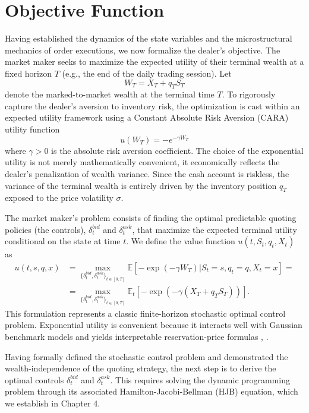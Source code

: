 \documentclass[a4paper,10pt,titlepage,oneside,openany]{book}
\theoremstyle{plain}\newtheorem{theorem}{Theorem}[chapter]
\theoremstyle{definition}\newtheorem{definition}{Definition}[chapter]
\theoremstyle{remark}\newtheorem{remark}{Remark}[chapter]
\begin{document}
\section{Objective Function}
Having established the dynamics of the state variables and the microstructural mechanics of order executions, we now formalize the dealer's objective. The market maker seeks to maximize the expected utility of their terminal wealth at a fixed horizon $T$ (e.g., the end of the daily trading session). Let 
\[
W_T = X_T + q_TS_T
\]
denote the marked-to-market wealth at the terminal time $T$. To rigorously capture the dealer's aversion to inventory risk, the optimization is cast within an expected utility framework using a Constant Absolute Risk Aversion (CARA) utility function
\[
u(W_T) = -e^{-\gamma W_T} 
\]
where $\gamma>0$ is the absolute risk aversion coefficient. The choice of the exponential utility is not merely mathematically convenient, it economically reflects the dealer's penalization of wealth variance. Since the cash account is riskless, the variance of the terminal wealth is entirely driven by the inventory position $q_T$ exposed to the price volatility $\sigma$.

The market maker's problem consists of finding the optimal predictable quoting policies (the controls), $\delta_t^{bid}$ and $\delta_t^{ask}$, that maximize the expected terminal utility conditional on the state at time $t$. We define the value function $u(t,S_t ,q_t, X_t)$ as
\begin{align*}
    u(t,s,q,x)&=\max_{\{\delta_t^{bid},\delta_t^{ask}\}_{t\in[0,T]}} \mathbb{E}\left[-\exp\!\left(-\gamma W_T\right)|S_t=s,q_t=q,X_t=x\right]=\\
    &=\max_{\{\delta_t^{bid},\delta_t^{ask}\}_{t\in[0,T]}} \mathbb{E}_t\left[-\exp\!\left(-\gamma (X_T+q_TS_T)\right)\right].
\end{align*}
This formulation represents a classic finite-horizon stochastic optimal control problem. Exponential utility is convenient because it interacts well with Gaussian benchmark models and yields interpretable reservation-price formulas \cite{AvellanedaStoikov2008}, \cite{GueantLehalleFernandezTapia2013}.

Having formally defined the stochastic control problem and demonstrated the wealth-independence of the quoting strategy, the next step is to derive the optimal controls $\delta_t^{bid}$ and $\delta_t^{ask}$. This requires solving the dynamic programming problem through its associated Hamilton-Jacobi-Bellman (HJB) equation, which we establish in Chapter 4.
\end{document}
